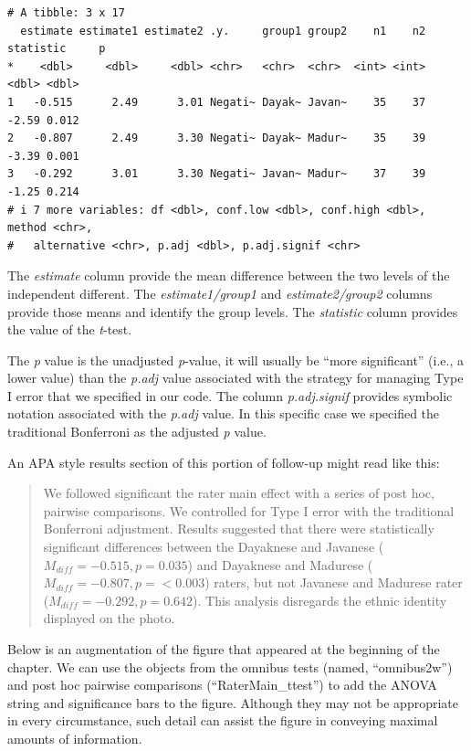 \documentclass[
  11pt,
]{book}
\begin{document}
\begin{verbatim}
# A tibble: 3 x 17
  estimate estimate1 estimate2 .y.     group1 group2    n1    n2 statistic     p
*    <dbl>     <dbl>     <dbl> <chr>   <chr>  <chr>  <int> <int>     <dbl> <dbl>
1   -0.515      2.49      3.01 Negati~ Dayak~ Javan~    35    37     -2.59 0.012
2   -0.807      2.49      3.30 Negati~ Dayak~ Madur~    35    39     -3.39 0.001
3   -0.292      3.01      3.30 Negati~ Javan~ Madur~    37    39     -1.25 0.214
# i 7 more variables: df <dbl>, conf.low <dbl>, conf.high <dbl>, method <chr>,
#   alternative <chr>, p.adj <dbl>, p.adj.signif <chr>
\end{verbatim}

The \emph{estimate} column provide the mean difference between the two levels of the independent different. The \emph{estimate1/group1} and \emph{estimate2/group2} columns provide those means and identify the group levels. The \emph{statistic} column provides the value of the \emph{t}-test.

The \emph{p} value is the unadjusted \emph{p}-value, it will usually be ``more significant'' (i.e., a lower value) than the \emph{p.adj} value associated with the strategy for managing Type I error that we specified in our code. The column \emph{p.adj.signif} provides symbolic notation associated with the \emph{p.adj} value. In this specific case we specified the traditional Bonferroni as the adjusted \emph{p} value.

An APA style results section of this portion of follow-up might read like this:

\begin{quote}
We followed significant the rater main effect with a series of post hoc, pairwise comparisons. We controlled for Type I error with the traditional Bonferroni adjustment. Results suggested that there were statistically significant differences between the Dayaknese and Javanese (\(M_{diff} = -0.515, p = 0.035\)) and Dayaknese and Madurese (\(M_{diff} = -0.807, p =< 0.003\)) raters, but not Javanese and Madurese rater (\(M_{diff} = -0.292, p = 0.642\)). This analysis disregards the ethnic identity displayed on the photo.
\end{quote}

Below is an augmentation of the figure that appeared at the beginning of the chapter. We can use the objects from the omnibus tests (named, ``omnibus2w'') and post hoc pairwise comparisons (``RaterMain\_ttest'') to add the ANOVA string and significance bars to the figure. Although they may not be appropriate in every circumstance, such detail can assist the figure in conveying maximal amounts of information.
\end{document}
